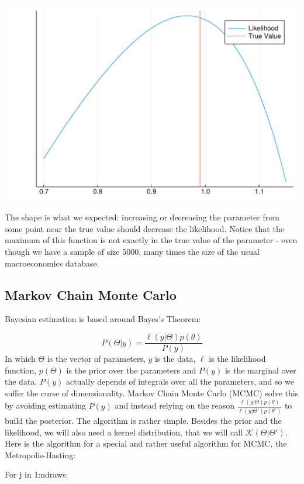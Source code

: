 \documentclass[12pt,a4paper]{article}
\begin{document}
\includegraphics[width=\linewidth]{figures/dsge_and_julia_17_1.pdf}

The shape is what we expected: increasing or decreasing the parameter from some point near the true value should decrease the likelihood. Notice that the maximum of this function is not exactly in the true value of the parameter - even though we have a sample of size 5000, many times the size of the usual macroeconomics database.

\subsection{Markov Chain Monte Carlo}
Bayesian estimation is based around Bayes's Theorem:

\[
P(\Theta|y) = \frac{\ell(y|\Theta)p(\theta)}{P(y)}
\]
In which $\Theta$ is the vector of parameters, $y$ is the data, $\ell$ is the likelihood function, $p(\Theta)$ is the prior over the parameters and $P(y)$ is the marginal over the data. $P(y)$ actually depends of integrals over all the parameters, and so we suffer the curse of dimensionality. Markov Chain Monte Carlo (MCMC) solve this by avoiding estimating $P(y)$ and instead relying on the reason $\frac{\ell(y|\Theta)p(\theta)}{\ell(y|\Theta')p(\theta')}$ to build the posterior. The algorithm is rather simple. Besides the prior and the likelihood, we will also need a kernel distribution, that we will call $\mathcal{K}(\Theta|\Theta')$. Here is the algorithm for a special and rather useful algorithm for MCMC, the Metropolis-Hasting:

For j in 1:ndraws:
\end{document}
